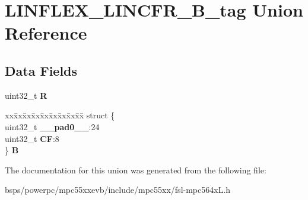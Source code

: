 \hypertarget{unionLINFLEX__LINCFR__32B__tag}{}\section{L\+I\+N\+F\+L\+E\+X\+\_\+\+L\+I\+N\+C\+F\+R\+\_\+B\+\_\+tag Union Reference}
\label{unionLINFLEX__LINCFR__32B__tag}
\subsection*{Data Fields}
\begin{DoxyCompactItemize}
\item 
\mbox{\label{unionLINFLEX__LINCFR__32B__tag_aaf423addb8f2f08956f75dd055b2547f}} 
uint32\+\_\+t {\bfseries R}
\item 
\mbox{\label{unionLINFLEX__LINCFR__32B__tag_abdf98ef364ee339db284133717d1b94d}} 
\begin{tabbing}
xx\=xx\=xx\=xx\=xx\=xx\=xx\=xx\=xx\=\kill
struct \{\\
\>uint32\_t {\bfseries \_\_pad0\_\_}:24\\
\>uint32\_t {\bfseries CF}:8\\
\} {\bfseries B}\\

\end{tabbing}\end{DoxyCompactItemize}


The documentation for this union was generated from the following file\+:\begin{DoxyCompactItemize}
\item 
bsps/powerpc/mpc55xxevb/include/mpc55xx/fsl-\/mpc564x\+L.\+h\end{DoxyCompactItemize}
